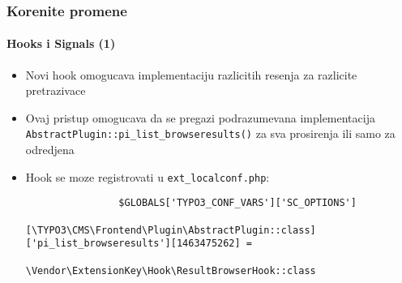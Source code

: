 \begin{frame}[fragile]
	\frametitle{Korenite promene}
	\framesubtitle{Hooks i Signals (1)}

	\lstset{basicstyle=\tiny\ttfamily}

	\begin{itemize}

		\item Novi hook omogucava implementaciju razlicitih resenja za razlicite pretrazivace

		\item Ovaj pristup omogucava da se pregazi podrazumevana implementacija
			\texttt{AbstractPlugin::pi\_list\_browseresults()}
			za sva prosirenja ili samo za odredjena

		\item Hook se moze registrovati u \texttt{ext\_localconf.php}:

			\begin{lstlisting}
				$GLOBALS['TYPO3_CONF_VARS']['SC_OPTIONS']
				  [\TYPO3\CMS\Frontend\Plugin\AbstractPlugin::class]['pi_list_browseresults'][1463475262] =
				  \Vendor\ExtensionKey\Hook\ResultBrowserHook::class
			\end{lstlisting}

	\end{itemize}

\end{frame}


